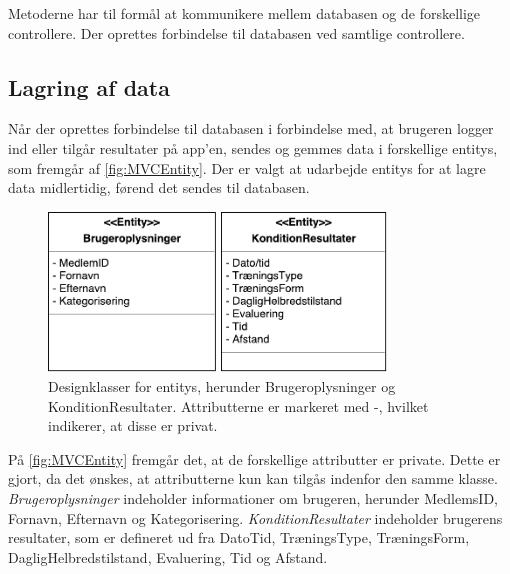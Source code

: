 Metoderne har til formål at kommunikere mellem databasen og de forskellige controllere. Der oprettes forbindelse til databasen ved samtlige controllere. 

\subsection*{Lagring af data}  \label{sec:entity}
Når der oprettes forbindelse til databasen i forbindelse med, at brugeren logger ind eller tilgår resultater på app'en, sendes og gemmes data i forskellige entitys, som fremgår af \autoref{fig:MVCEntity}. Der er valgt at udarbejde entitys for at lagre data midlertidig, førend det sendes til databasen. 

\begin{figure} [H]
\centering
\includegraphics[width=0.8\textwidth]{figures/MVC/Entity}
\caption{Designklasser for entitys, herunder Brugeroplysninger og KonditionResultater. Attributterne er markeret med -, hvilket indikerer, at disse er privat.}
\label{fig:MVCEntity}
\end{figure}

\noindent
På \autoref{fig:MVCEntity} fremgår det, at de forskellige attributter er private. Dette er gjort, da det ønskes, at attributterne kun kan tilgås indenfor den samme klasse. 
\textit{Brugeroplysninger} indeholder informationer om brugeren, herunder MedlemsID, Fornavn, Efternavn og Kategorisering. 
\textit{KonditionResultater} indeholder brugerens resultater, som er defineret ud fra DatoTid, TræningsType, TræningsForm, DagligHelbredstilstand, Evaluering, Tid og Afstand. 
